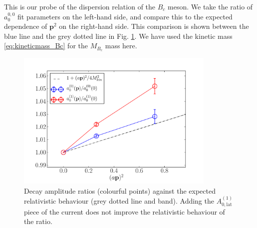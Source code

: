 This is our probe of the dispersion relation of the $B_c$ meson. We take the ratio of $a_0^{0,0}$ fit parameters on the left-hand side, and compare this to the expected dependence of ${\textbf{p}}^2$ on the right-hand side. This comparison is shown between the blue line and the grey dotted line in Fig. \ref{fig:relativisticnorm}. We have used the kinetic mass \eqref{eq:kineticmass_Bc} for the $M_{B_c}$ mass here.

\begin{figure}[htp!]
  \begin{center}
    \includegraphics[width=0.85\textwidth]{images/nrqcd/relativistic_normalization_J0J1.pdf}
  \end{center}
  \caption{Decay amplitude ratios (colourful points) against the expected relativistic behaviour (grey dotted line and band). Adding the $A_{0,\text{lat}}^{(1)}$ piece of the current does not improve the relativistic behaviour of the ratio. \label{fig:relativisticnorm}}
\end{figure}

